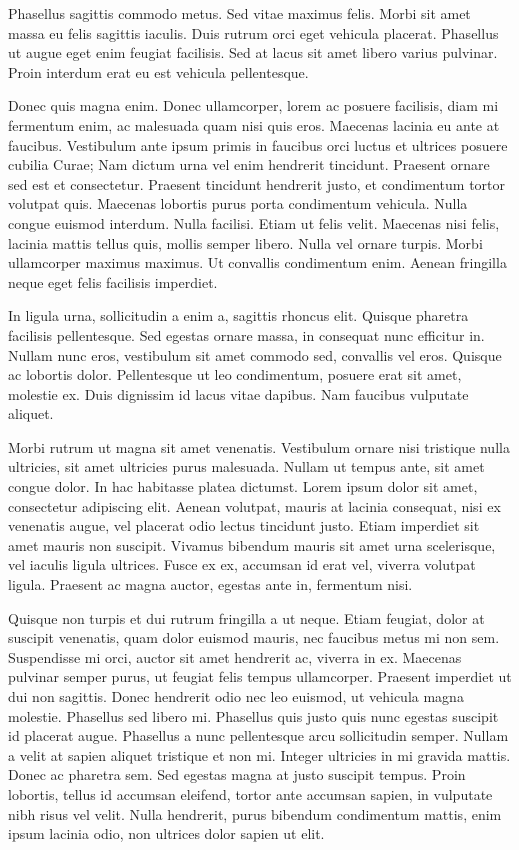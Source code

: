\documentclass[a4paper,twoside,notitlepage,openright,11pt]{report}
\begin{document}
Phasellus sagittis commodo metus. Sed vitae maximus felis. Morbi sit amet massa eu felis sagittis iaculis. Duis rutrum orci eget vehicula placerat. Phasellus ut augue eget enim feugiat facilisis. Sed at lacus sit amet libero varius pulvinar. Proin interdum erat eu est vehicula pellentesque.

Donec quis magna enim. Donec ullamcorper, lorem ac posuere facilisis, diam mi fermentum enim, ac malesuada quam nisi quis eros. Maecenas lacinia eu ante at faucibus. Vestibulum ante ipsum primis in faucibus orci luctus et ultrices posuere cubilia Curae; Nam dictum urna vel enim hendrerit tincidunt. Praesent ornare sed est et consectetur. Praesent tincidunt hendrerit justo, et condimentum tortor volutpat quis. Maecenas lobortis purus porta condimentum vehicula. Nulla congue euismod interdum. Nulla facilisi. Etiam ut felis velit. Maecenas nisi felis, lacinia mattis tellus quis, mollis semper libero. Nulla vel ornare turpis. Morbi ullamcorper maximus maximus. Ut convallis condimentum enim. Aenean fringilla neque eget felis facilisis imperdiet.

In ligula urna, sollicitudin a enim a, sagittis rhoncus elit. Quisque pharetra facilisis pellentesque. Sed egestas ornare massa, in consequat nunc efficitur in. Nullam nunc eros, vestibulum sit amet commodo sed, convallis vel eros. Quisque ac lobortis dolor. Pellentesque ut leo condimentum, posuere erat sit amet, molestie ex. Duis dignissim id lacus vitae dapibus. Nam faucibus vulputate aliquet.

Morbi rutrum ut magna sit amet venenatis. Vestibulum ornare nisi tristique nulla ultricies, sit amet ultricies purus malesuada. Nullam ut tempus ante, sit amet congue dolor. In hac habitasse platea dictumst. Lorem ipsum dolor sit amet, consectetur adipiscing elit. Aenean volutpat, mauris at lacinia consequat, nisi ex venenatis augue, vel placerat odio lectus tincidunt justo. Etiam imperdiet sit amet mauris non suscipit. Vivamus bibendum mauris sit amet urna scelerisque, vel iaculis ligula ultrices. Fusce ex ex, accumsan id erat vel, viverra volutpat ligula. Praesent ac magna auctor, egestas ante in, fermentum nisi.

Quisque non turpis et dui rutrum fringilla a ut neque. Etiam feugiat, dolor at suscipit venenatis, quam dolor euismod mauris, nec faucibus metus mi non sem. Suspendisse mi orci, auctor sit amet hendrerit ac, viverra in ex. Maecenas pulvinar semper purus, ut feugiat felis tempus ullamcorper. Praesent imperdiet ut dui non sagittis. Donec hendrerit odio nec leo euismod, ut vehicula magna molestie. Phasellus sed libero mi. Phasellus quis justo quis nunc egestas suscipit id placerat augue. Phasellus a nunc pellentesque arcu sollicitudin semper. Nullam a velit at sapien aliquet tristique et non mi. Integer ultricies in mi gravida mattis. Donec ac pharetra sem. Sed egestas magna at justo suscipit tempus. Proin lobortis, tellus id accumsan eleifend, tortor ante accumsan sapien, in vulputate nibh risus vel velit. Nulla hendrerit, purus bibendum condimentum mattis, enim ipsum lacinia odio, non ultrices dolor sapien ut elit.
\end{document}
